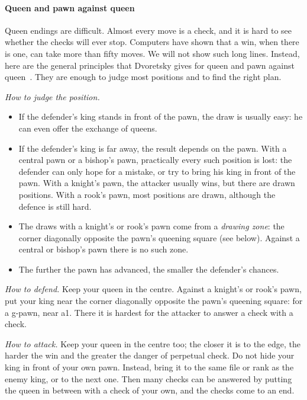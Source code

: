 
\paragraph{Queen and pawn against queen}\label{queen-and-pawn}
Queen endings are difficult. Almost every move is a check, and it is hard to see whether the checks
will ever stop. Computers have shown that a win, when there is one, can take more than fifty moves.
We will not show such long lines. Instead, here are the general principles that Dvoretsky gives
for queen and pawn against queen~\cite{Dvoretsky:2008-endgame-manual}. They are enough to judge
most positions and to find the right plan.

\emph{How to judge the position.}
\begin{itemize}
\item If the defender's king stands in front of the pawn, the draw is usually easy: he can even
offer the exchange of queens.
\item If the defender's king is far away, the result depends on the pawn. With a central pawn or a
bishop's pawn, practically every such position is lost: the defender can only hope for a mistake,
or try to bring his king in front of the pawn. With a knight's pawn, the attacker usually wins,
but there are drawn positions. With a rook's pawn, most positions are drawn, although the defence
is still hard.
\item The draws with a knight's or rook's pawn come from a \emph{drawing zone}: the corner
diagonally opposite the pawn's queening square (see below). Against a central or bishop's pawn
there is no such zone.
\item The further the pawn has advanced, the smaller the defender's chances.
\end{itemize}

\emph{How to defend.} Keep your queen in the centre. Against a knight's or rook's pawn, put your
king near the corner diagonally opposite the pawn's queening square: for a g-pawn, near a1. There
it is hardest for the attacker to answer a check with a check.

\emph{How to attack.} Keep your queen in the centre too; the closer it is to the edge, the harder
the win and the greater the danger of perpetual check. Do not hide your king in front of your own
pawn. Instead, bring it to the same file or rank as the enemy king, or to the next one. Then many
checks can be answered by putting the queen in between with a check of your own, and the checks
come to an end.
